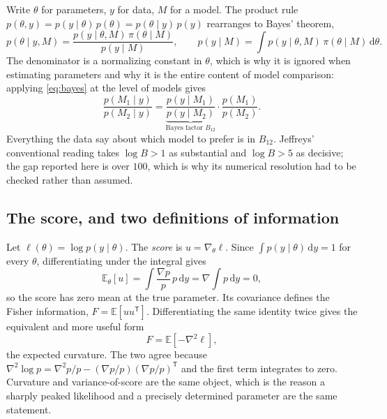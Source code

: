 \documentclass[10pt]{article}
\begin{document}
Write $\theta$ for parameters, $y$ for data, $M$ for a model. The product rule
$p(\theta, y) = p(y\mid\theta)\,p(\theta) = p(\theta\mid y)\,p(y)$ rearranges to Bayes'
theorem,
%
\begin{equation}
p(\theta \mid y, M) = \frac{p(y\mid\theta,M)\,\pi(\theta\mid M)}{p(y\mid M)},
\qquad
p(y\mid M) = \int p(y\mid\theta,M)\,\pi(\theta\mid M)\,\mathrm{d}\theta .
\label{eq:bayes}
\end{equation}
%
The denominator is a normalizing constant in $\theta$, which is why it is ignored when
estimating parameters and why it is the entire content of model comparison: applying
\eqref{eq:bayes} at the level of models gives
%
\begin{equation}
\frac{p(M_1\mid y)}{p(M_2\mid y)}
= \underbrace{\frac{p(y\mid M_1)}{p(y\mid M_2)}}_{\text{Bayes factor } B_{12}}
  \cdot \frac{p(M_1)}{p(M_2)} .
\end{equation}
%
Everything the data say about which model to prefer is in $B_{12}$. Jeffreys' conventional
reading takes $\log B > 1$ as substantial and $\log B > 5$ as decisive; the gap reported
here is over $100$, which is why its numerical resolution had to be checked rather than
assumed.

\subsection{The score, and two definitions of information}

Let $\ell(\theta) = \log p(y\mid\theta)$. The \emph{score} is $u = \nabla_\theta \ell$. Since
$\int p(y\mid\theta)\,\mathrm{d}y = 1$ for every $\theta$, differentiating under the integral
gives
%
\begin{equation}
\mathbb{E}_\theta[u] = \int \frac{\nabla p}{p}\,p \,\mathrm{d}y
= \nabla\!\int p \,\mathrm{d}y = 0 ,
\end{equation}
%
so the score has zero mean at the true parameter. Its covariance defines the Fisher
information, $F = \mathbb{E}[uu^{\mathsf T}]$. Differentiating the same identity twice gives
the equivalent and more useful form
%
\begin{equation}
F = \mathbb{E}\!\left[-\nabla^2\ell\right],
\end{equation}
%
the expected curvature. The two agree because
$\nabla^2\log p = \nabla^2 p/p - (\nabla p/p)(\nabla p/p)^{\mathsf T}$ and the first term
integrates to zero. Curvature and variance-of-score are the same object, which is the
reason a sharply peaked likelihood and a precisely determined parameter are the same
statement.
\end{document}
